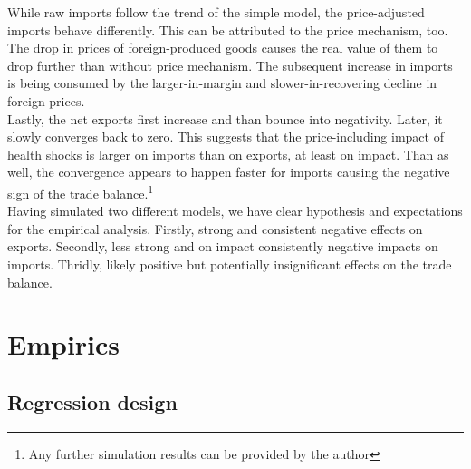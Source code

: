 \documentclass{article}
\begin{document}
While raw imports follow the trend of the simple model, the price-adjusted imports behave differently. This can be attributed to the price mechanism, too. The drop in prices of foreign-produced goods causes the real value of them to drop further than without price mechanism. The subsequent increase in imports is being consumed by the larger-in-margin and slower-in-recovering decline in foreign prices. \\
Lastly, the net exports first increase and than bounce into negativity. Later, it slowly converges back to zero. This suggests that the price-including impact of health shocks is larger on imports than on exports, at least on impact. Than as well, the convergence appears to happen faster for imports causing the negative sign of the trade balance.\footnote{Any further simulation results can be provided by the author}\\
Having simulated two different models, we have clear hypothesis and expectations for the empirical analysis. Firstly, strong and consistent negative effects on exports. Secondly, less strong and on impact consistently negative impacts on imports. Thridly, likely positive but potentially insignificant effects on the trade balance.

\section{Empirics}

\subsection{Regression design}
\end{document}
